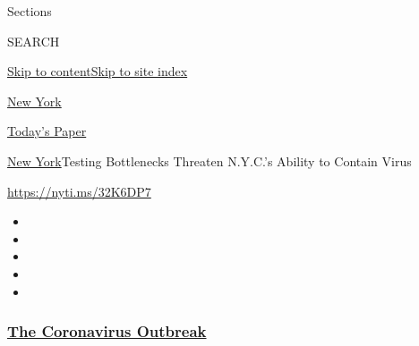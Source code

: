 Sections

SEARCH

\protect\hyperlink{site-content}{Skip to
content}\protect\hyperlink{site-index}{Skip to site index}

\href{https://www.nytimes3xbfgragh.onion/section/nyregion}{New York}

\href{https://myaccount.nytimes3xbfgragh.onion/auth/login?response_type=cookie\&client_id=vi}{}

\href{https://www.nytimes3xbfgragh.onion/section/todayspaper}{Today's
Paper}

\href{/section/nyregion}{New York}\textbar{}Testing Bottlenecks Threaten
N.Y.C.'s Ability to Contain Virus

\url{https://nyti.ms/32K6DP7}

\begin{itemize}
\item
\item
\item
\item
\item
\end{itemize}

\hypertarget{the-coronavirus-outbreak}{%
\subsubsection{\texorpdfstring{\href{https://www.nytimes3xbfgragh.onion/news-event/coronavirus?name=styln-coronavirus-national\&region=TOP_BANNER\&variant=undefined\&block=storyline_menu_recirc\&action=click\&pgtype=Article\&impression_id=52705dc0-e386-11ea-9429-99c7ddc8e385}{The
Coronavirus
Outbreak}}{The Coronavirus Outbreak}}\label{the-coronavirus-outbreak}}

